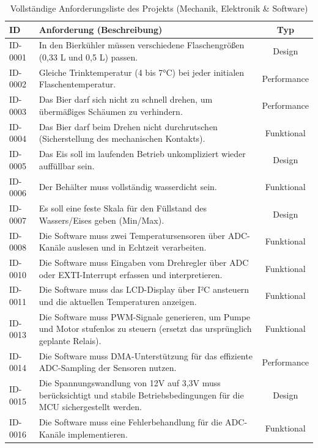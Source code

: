\begin{table}[h]
	\centering
	\caption{Vollständige Anforderungsliste des Projekts (Mechanik, Elektronik \& Software)}
	\label{tab:all_requirements}
	\begin{tabularx}{\textwidth}{l X c}
		\toprule
		\textbf{ID} & \textbf{Anforderung (Beschreibung)} & \textbf{Typ} \\
		\midrule
		ID-0001 & In den Bierkühler müssen verschiedene Flaschengrößen (0,33 L und 0,5 L) passen. & Design \\
		\addlinespace
		ID-0002 & Gleiche Trinktemperatur (4 bis 7°C) bei jeder initialen Flaschentemperatur. & Performance \\
		\addlinespace
		ID-0003 & Das Bier darf sich nicht zu schnell drehen, um übermäßiges Schäumen zu verhindern. & Performance \\
		\addlinespace
		ID-0004 & Das Bier darf beim Drehen nicht durchrutschen (Sicherstellung des mechanischen Kontakts). & Funktional \\
		\addlinespace
		ID-0005 & Das Eis soll im laufenden Betrieb unkompliziert wieder auffüllbar sein. & Design \\
		\addlinespace
		ID-0006 & Der Behälter muss vollständig wasserdicht sein. & Funktional \\
		\addlinespace
		ID-0007 & Es soll eine feste Skala für den Füllstand des Wassers/Eises geben (Min/Max). & Design \\
		\addlinespace
		ID-0008 & Die Software muss zwei Temperatursensoren über ADC-Kanäle auslesen und in Echtzeit verarbeiten. & Funktional \\
		\addlinespace
		ID-0010 & Die Software muss Eingaben vom Drehregler über ADC oder EXTI-Interrupt erfassen und interpretieren. & Funktional \\
		\addlinespace
		ID-0011 & Die Software muss das LCD-Display über I²C ansteuern und die aktuellen Temperaturen anzeigen. & Funktional \\
		\addlinespace
		ID-0013 & Die Software muss PWM-Signale generieren, um Pumpe und Motor stufenlos zu steuern (ersetzt das ursprünglich geplante Relais). & Funktional \\
		\addlinespace
		ID-0014 & Die Software muss DMA-Unterstützung für das effiziente ADC-Sampling der Sensoren nutzen. & Performance \\
		\addlinespace
		ID-0015 & Die Spannungswandlung von 12V auf 3,3V muss berücksichtigt und stabile Betriebsbedingungen für die MCU sichergestellt werden. & Design \\
		\addlinespace
		ID-0016 & Die Software muss eine Fehlerbehandlung für die ADC-Kanäle implementieren. & Funktional \\
		\bottomrule
	\end{tabularx}
\end{table}

